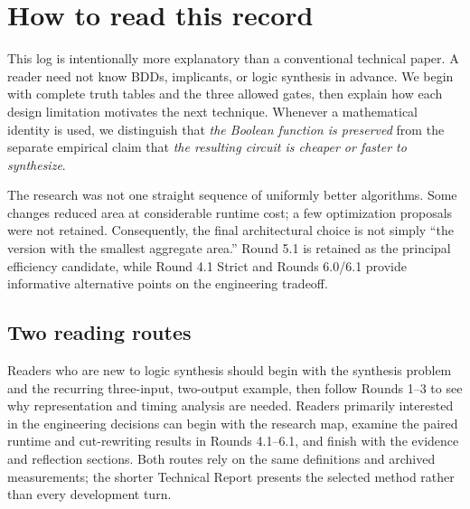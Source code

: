 \section{How to read this record}
This log is intentionally more explanatory than a conventional technical paper. A reader need not know BDDs, implicants, or logic synthesis in advance. We begin with complete truth tables and the three allowed gates, then explain how each design limitation motivates the next technique. Whenever a mathematical identity is used, we distinguish that \emph{the Boolean function is preserved} from the separate empirical claim that \emph{the resulting circuit is cheaper or faster to synthesize}.

The research was not one straight sequence of uniformly better algorithms. Some changes reduced area at considerable runtime cost; a few optimization proposals were not retained. Consequently, the final architectural choice is not simply ``the version with the smallest aggregate area.'' Round 5.1 is retained as the principal efficiency candidate, while Round 4.1 Strict and Rounds 6.0/6.1 provide informative alternative points on the engineering tradeoff.

\subsection{Two reading routes}
Readers who are new to logic synthesis should begin with the synthesis problem and the recurring three-input, two-output example, then follow Rounds 1--3 to see why representation and timing analysis are needed. Readers primarily interested in the engineering decisions can begin with the research map, examine the paired runtime and cut-rewriting results in Rounds 4.1--6.1, and finish with the evidence and reflection sections. Both routes rely on the same definitions and archived measurements; the shorter Technical Report presents the selected method rather than every development turn.

